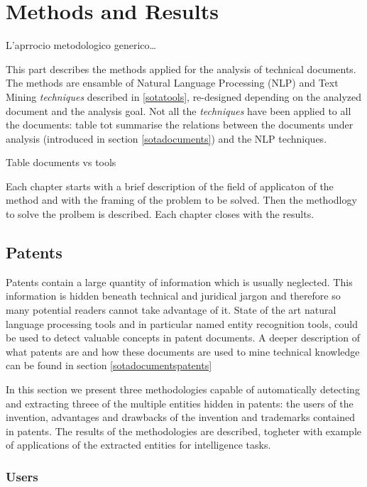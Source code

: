 \documentclass[]{book}
\begin{document}
\part{Methods and Results}\label{part-methods-and-results}

L'aprrocio metodologico generico\ldots{}

This part describes the methods applied for the analysis of technical
documents. The methods are ensamble of Natural Language Processing (NLP)
and Text Mining \emph{techniques} described in \ref{sotatools},
re-designed depending on the analyzed document and the analysis goal.
Not all the \emph{techniques} have been applied to all the documents:
table tot summarise the relations between the documents under analysis
(introduced in section \ref{sotadocuments}) and the NLP techniques.

Table documents vs tools

Each chapter starts with a brief description of the field of applicaton
of the method and with the framing of the problem to be solved. Then the
methodlogy to solve the prolbem is described. Each chapter closes with
the results.

\chapter{Patents}\label{patents}

Patents contain a large quantity of information which is usually
neglected. This information is hidden beneath technical and juridical
jargon and therefore so many potential readers cannot take advantage of
it. State of the art natural language processing tools and in particular
named entity recognition tools, could be used to detect valuable
concepts in patent documents. A deeper description of what patents are
and how these documents are used to mine technical knowledge can be
found in section \ref{sotadocumentspatents}

In this section we present three methodologies capable of automatically
detecting and extracting threee of the multiple entities hidden in
patents: the users of the invention, advantages and drawbacks of the
invention and trademarks contained in patents. The results of the
methodologies are described, togheter with example of applications of
the extracted entities for intelligence tasks.

\section{Users}\label{usersresults}
\end{document}
